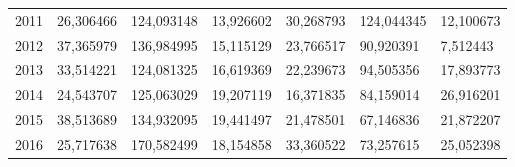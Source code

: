 \begin{table}
\begin{tabular}{p{1cm}p{2cm}p{2cm}p{2cm}p{2cm}p{2cm}p{2cm}}
 2011 & 26,306466 &                                         124,093148 &                      13,926602 &   30,268793 & 124,044345 &                           12,100673 \\
 2012 & 37,365979 &                                         136,984995 &                      15,115129 &   23,766517 &  90,920391 &                            7,512443 \\
 2013 & 33,514221 &                                         124,081325 &                      16,619369 &   22,239673 &  94,505356 &                           17,893773 \\
 2014 & 24,543707 &                                         125,063029 &                      19,207119 &   16,371835 &  84,159014 &                           26,916201 \\
 2015 & 38,513689 &                                         134,932095 &                      19,441497 &   21,478501 &  67,146836 &                           21,872207 \\
 2016 & 25,717638 &                                         170,582499 &                      18,154858 &   33,360522 &  73,257615 &                           25,052398 \\
\bottomrule
\end{tabular}
\end{table}
